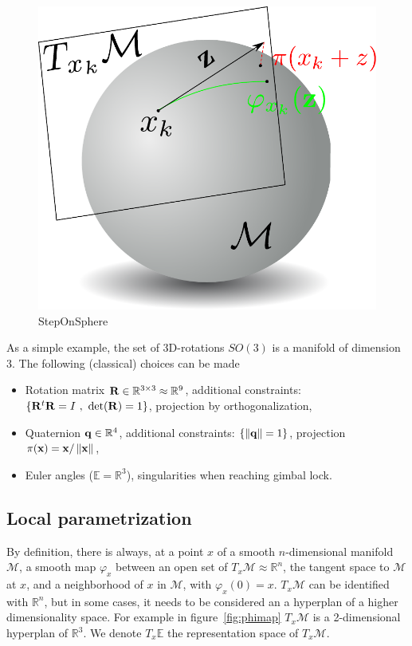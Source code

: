 \begin{figure}[htpb]
  \centering
  \includegraphics[width=0.5\linewidth]{Humanoids2015/stepOnSphere.pdf}
  \caption{StepOnSphere}
  \label{fig:stepOnSphere}
\end{figure}

As a simple example, the set of 3D-rotations $SO(3)$ is a manifold of dimension $3$.
The following (classical) choices can be made
\begin{itemize}
  \item Rotation matrix ${\bf R} \in \mathbb{R}^{3\times 3} \approx \mathbb{R}^9$, additional constraints: $\{{\bf R}^t{\bf R} = I\ ,\ \det({\bf R})=1\}$, projection by orthogonalization,
  \item Quaternion ${\bf q} \in \mathbb{R}^4$, additional constraints: $\{ \left\|{\bf q}\right\|=1\}$, projection $\pi({\bf x}) = {\bf x}/\left\|{\bf x}\right\|$,
  \item Euler angles ($\mathbb{E} = \mathbb{R}^3$), singularities when reaching gimbal lock.
\end{itemize}

\subsection{Local parametrization}
By definition, there is always, at a point $x$ of a smooth $n$-dimensional manifold $\mathcal{M}$, a smooth map $\varphi_x$ between an open set of $T_x\mathcal{M}\approx \mathbb{R}^n$, the tangent space to $\mathcal{M}$ at $x$, and a neighborhood of $x$ in $\mathcal{M}$, with $\varphi_x(0) = x$.
$T_x\mathcal{M}$ can be identified with $\mathbb{R}^n$, but in some cases, it needs to be considered an a hyperplan of a higher dimensionality space. For example in figure~\ref{fig:phimap} $T_x\mathcal{M}$ is a 2-dimensional hyperplan of $\mathbb{R}^3$. We denote $T_x\mathbb{E}$ the representation space of $T_x\mathcal{M}$.

